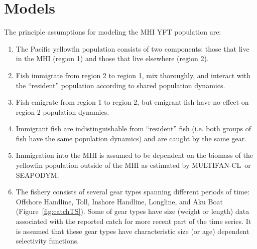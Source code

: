 \documentclass[12pt,letterpaper]{article}
\newcommand\SD{SEAPODYM}
\newcommand\MFCL{MULTIFAN-CL}
\begin{document}
\section*{Models}
The principle assumptions for modeling the MHI YFT population are:
\begin{enumerate}
\item The Pacific yellowfin population consists of two components: those
that live in the MHI (region 1) and those that live elsewhere (region
2).
\item Fish immigrate from region 2 to region 1, mix thoroughly, and
interact with the ``resident'' population according to
shared population dynamics.
\item Fish emigrate from region 1 to region 2, but emigrant fish have
no effect on region 2 population dynamics.
\item Immigrant fish are indistinguishable from ``resident'' fish
(i.e. both groups of fish have the same population dynamics) and are
caught by the same gear.
\item Immigration into the MHI is assumed to be dependent on the
biomass of the yellowfin population outside of the MHI as estimated by
\MFCL\ or \SD.
\item The fishery consists of several gear types spanning different periods
of time: Offshore Handline, Toll, Inshore Handline, Longline, and Aku
Boat (Figure~\ref{fig:catchTS}). Some of gear types have size
(weight or length) data associated with the reported catch for more recent
part of the time series. It is assumed that these
gear types have characteristic size (or age) dependent selectivity
functions.
\end{enumerate}
\end{document}
